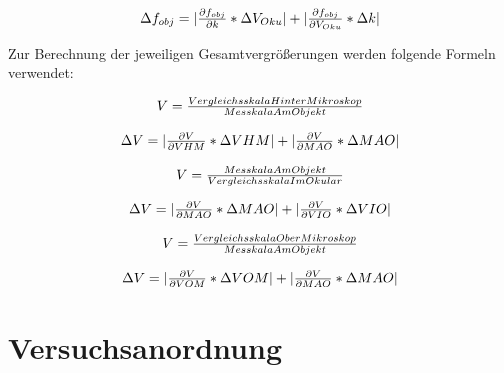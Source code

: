 \documentclass[12pt,a4paper,twoside]{article}
\begin{document}
\begin{equation}
    \label{eq:Unsicherheit_Objektivbrennweite}
    \centerline{$\Delta f_{obj} = \vert \frac{\partial f_{obj}}{\partial k} * \Delta V_{Oku} \vert + \vert \frac{\partial f_{obj}}{\partial V_{Oku}} * \Delta k \vert $}
\end{equation}

\noindent
Zur Berechnung der jeweiligen Gesamtvergrößerungen werden folgende Formeln verwendet:

\begin{equation}
    \label{eq:VergrößerungAM}
    \centerline{$V=\frac{Vergleichsskala Hinter Mikroskop}{Messkala Am Objekt}$}
\end{equation}

\begin{equation}
    \label{eq:Unsicherheit_VergrößerungAM}
    \centerline{$\Delta V = \vert \frac{\partial V}{\partial VHM} * \Delta VHM \vert + \vert \frac{\partial V}{\partial MAO} * \Delta MAO \vert $}
\end{equation}

\begin{equation}
    \label{eq:VergrößerungAM10x}
    \centerline{$V=\frac{Messkala Am Objekt}{Vergleichsskala Im Okular}$}
\end{equation}

\begin{equation}
    \label{eq:Unsicherheit_VergrößerungAM10x}
    \centerline{$\Delta V = \vert \frac{\partial V}{\partial MAO} * \Delta MAO \vert + \vert \frac{\partial V}{\partial VIO} * \Delta VIO \vert $}
\end{equation}

\begin{equation}
    \label{eq:VergrößerungNM}  
    \centerline{$V=\frac{Vergleichsskala Ober Mikroskop}{Messkala Am Objekt}$}
\end{equation}

\begin{equation}
    \label{eq:Unsicherheit_VergrößerungNM}
    \centerline{$\Delta V = \vert \frac{\partial V}{\partial VOM} * \Delta VOM \vert + \vert \frac{\partial V}{\partial MAO} * \Delta MAO \vert $}
\end{equation}



\section{Versuchsanordnung} %
\end{document}
